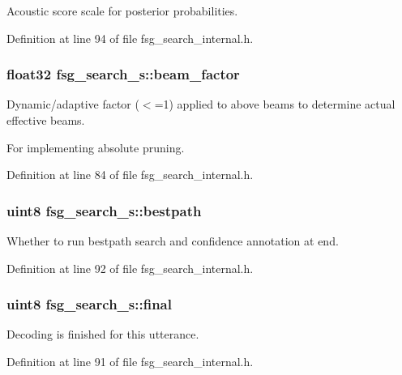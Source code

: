 Acoustic score scale for posterior probabilities. 



Definition at line 94 of file fsg\+\_\+search\+\_\+internal.\+h.

\subsubsection[{beam\+\_\+factor}]{\setlength{\rightskip}{0pt plus 5cm}float32 fsg\+\_\+search\+\_\+s\+::beam\+\_\+factor}\label{structfsg__search__s_a8e86d9f82189f8429d71ee2f67ecaaa2}


Dynamic/adaptive factor ($<$=1) applied to above beams to determine actual effective beams. 

For implementing absolute pruning. 

Definition at line 84 of file fsg\+\_\+search\+\_\+internal.\+h.

\subsubsection[{bestpath}]{\setlength{\rightskip}{0pt plus 5cm}uint8 fsg\+\_\+search\+\_\+s\+::bestpath}\label{structfsg__search__s_aba7eff57919c5a1de55eab3a62ff055a}


Whether to run bestpath search and confidence annotation at end. 



Definition at line 92 of file fsg\+\_\+search\+\_\+internal.\+h.

\subsubsection[{final}]{\setlength{\rightskip}{0pt plus 5cm}uint8 fsg\+\_\+search\+\_\+s\+::final}\label{structfsg__search__s_a5139d7ab35ae18407e06e78e1778f857}


Decoding is finished for this utterance. 



Definition at line 91 of file fsg\+\_\+search\+\_\+internal.\+h.

